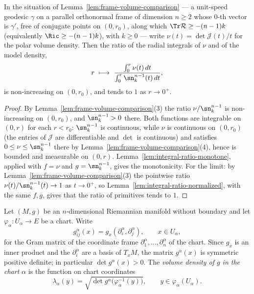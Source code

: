 \begin{lemma}
\label{lem:frame-bishop-gromov}
\leanok



In the situation of Lemma~\ref{lem:frame-volume-comparison} --- a unit-speed
geodesic $\gamma$ on a parallel orthonormal frame of dimension $n\ge2$ whose
$0$-th vector is $\gamma'$, free of conjugate points on $(0,r_0)$, along which
$\Tr\mathcal R\ge-(n-1)k$ (equivalently $\Ric\ge-(n-1)k$), with $k\ge0$ ---
write $\nu(t)=\det\mathcal J(t)/t$ for the polar volume density. Then the ratio
of the radial integrals of $\nu$ and of the model density,
$$r\ \longmapsto\ \frac{\int_0^r\nu(t)\,dt}{\int_0^r\sn_k^{n-1}(t)\,dt},$$
is non-increasing on $(0,r_0)$, and tends to $1$ as $r\to0^+$.
\end{lemma}

\begin{proof}
\sketch
{}
\leanok
By Lemma~\ref{lem:frame-volume-comparison}(3) the ratio $\nu/\sn_k^{n-1}$ is
non-increasing on $(0,r_0)$, and $\sn_k^{n-1}>0$ there. Both functions are
integrable on $(0,r)$ for each $r<r_0$: $\sn_k^{n-1}$ is continuous, while $\nu$
is continuous on $(0,r_0)$ (the entries of $\mathcal J$ are differentiable and
$\det$ is continuous) and satisfies $0\le\nu\le\sn_k^{n-1}$ there by
Lemma~\ref{lem:frame-volume-comparison}(4), hence is bounded and measurable on
$(0,r)$. Lemma~\ref{lem:integral-ratio-monotone}, applied with $f=\nu$ and
$g=\sn_k^{n-1}$, gives the monotonicity. For the limit: by
Lemma~\ref{lem:frame-volume-comparison}(3) the pointwise ratio
$\nu(t)/\sn_k^{n-1}(t)\to1$ as $t\to0^+$, so
Lemma~\ref{lem:integral-ratio-normalized}, with the same $f,g$, gives that the
ratio of primitives tends to $1$.
\end{proof}

\begin{definition}
\label{def:chart-volume-density}
\leanok



Let $(M,g)$ be an $n$-dimensional Riemannian manifold without boundary and let
$\varphi_\alpha\colon U_\alpha\to E$ be a chart. Write
$$g^\alpha_{ij}(x)=g_x(\partial^\alpha_i,\partial^\alpha_j),\qquad x\in U_\alpha,$$
for the Gram matrix of the coordinate frame $\partial^\alpha_1,\dots,\partial^\alpha_n$
of the chart. Since $g_x$ is an inner product and the $\partial^\alpha_i$ are a basis of
$T_xM$, the matrix $g^\alpha(x)$ is symmetric positive definite; in particular
$\det g^\alpha(x)>0$. The \emph{volume density of $g$ in the chart $\alpha$} is the
function on chart coordinates
$$\lambda_\alpha(y)=\sqrt{\det g^\alpha\bigl(\varphi_\alpha^{-1}(y)\bigr)},
\qquad y\in\varphi_\alpha(U_\alpha).$$
\end{definition}

